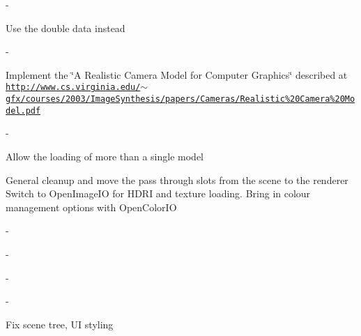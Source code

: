 
\begin{DoxyRefList}
\item[\label{todo__todo000005}%
\hypertarget{todo__todo000005}{}%
File \hyperlink{AABB_8h}{A\-A\-B\-B.h} ]-\/  
\item[\label{todo__todo000006}%
\hypertarget{todo__todo000006}{}%
File \hyperlink{BRDFLoader_8h}{B\-R\-D\-F\-Loader.h} ]Use the double data instead  
\item[\label{todo__todo000007}%
\hypertarget{todo__todo000007}{}%
File \hyperlink{BVHNodes_8h}{B\-V\-H\-Nodes.h} ]-\/  
\item[\label{todo__todo000008}%
\hypertarget{todo__todo000008}{}%
File \hyperlink{Camera_8h}{Camera.h} ]Implement the \char`\"{}\-A Realistic Camera Model for Computer Graphics\char`\"{} described at \href{http://www.cs.virginia.edu/~gfx/courses/2003/ImageSynthesis/papers/Cameras/Realistic%20Camera%20Model.pdf}{\tt http\-://www.\-cs.\-virginia.\-edu/$\sim$gfx/courses/2003/\-Image\-Synthesis/papers/\-Cameras/\-Realistic\%20\-Camera\%20\-Model.\-pdf}  
\item[\label{todo__todo000002}%
\hypertarget{todo__todo000002}{}%
File \hyperlink{MathHelpers_8cuh}{Math\-Helpers.cuh} ]-\/  
\item[\label{todo__todo000010}%
\hypertarget{todo__todo000010}{}%
File \hyperlink{MeshLoader_8h}{Mesh\-Loader.h} ]Allow the loading of more than a single model  
\item[\label{todo__todo000011}%
\hypertarget{todo__todo000011}{}%
File \hyperlink{NGLScene_8h}{N\-G\-L\-Scene.h} ]General cleanup and move the pass through slots from the scene to the renderer Switch to Open\-Image\-I\-O for H\-D\-R\-I and texture loading. Bring in colour management options with Open\-Color\-I\-O  
\item[\label{todo__todo000003}%
\hypertarget{todo__todo000003}{}%
File \hyperlink{PathTracer_8cuh}{Path\-Tracer.cuh} ]-\/  
\item[\label{todo__todo000001}%
\hypertarget{todo__todo000001}{}%
File \hyperlink{PathTracer_8h}{Path\-Tracer.h} ]-\/  
\item[\label{todo__todo000004}%
\hypertarget{todo__todo000004}{}%
File \hyperlink{RayIntersection_8cuh}{Ray\-Intersection.cuh} ]-\/  
\item[\label{todo__todo000012}%
\hypertarget{todo__todo000012}{}%
File \hyperlink{SBVH_8h}{S\-B\-V\-H.h} ]-\/  
\item[\label{todo__todo000009}%
\hypertarget{todo__todo000009}{}%
Namespace \hyperlink{namespaceUi}{Ui} ]Fix scene tree, U\-I styling  

\end{DoxyRefList}
